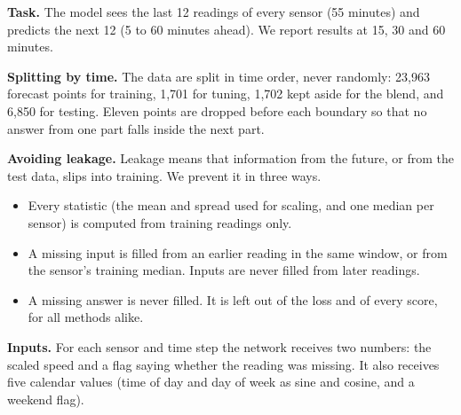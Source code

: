 \documentclass[conference]{IEEEtran}
\begin{document}
\textbf{Task.} The model sees the last 12 readings of every sensor (55 minutes) and predicts the next 12 (5 to 60 minutes ahead). We report results at 15, 30 and 60 minutes.

\textbf{Splitting by time.} The data are split in time order, never randomly: 23,963 forecast points for training, 1,701 for tuning, 1,702 kept aside for the blend, and 6,850 for testing. Eleven points are dropped before each boundary so that no answer from one part falls inside the next part.

\textbf{Avoiding leakage.} Leakage means that information from the future, or from the test data, slips into training. We prevent it in three ways.
\begin{itemize}
\item Every statistic (the mean and spread used for scaling, and one median per sensor) is computed from training readings only.
\item A missing input is filled from an earlier reading in the same window, or from the sensor's training median. Inputs are never filled from later readings.
\item A missing answer is never filled. It is left out of the loss and of every score, for all methods alike.
\end{itemize}

\textbf{Inputs.} For each sensor and time step the network receives two numbers: the scaled speed and a flag saying whether the reading was missing. It also receives five calendar values (time of day and day of week as sine and cosine, and a weekend flag).
\end{document}

